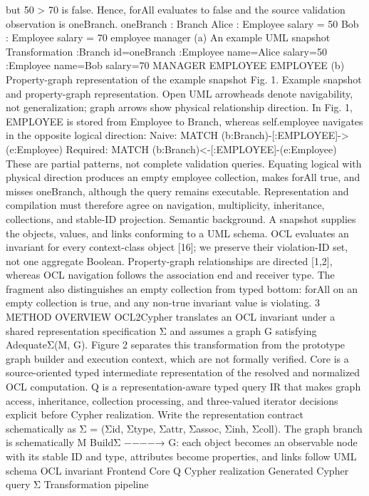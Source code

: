 but 50 > 70 is false. Hence, forAll evaluates to false and the source validation observation is {oneBranch}.
oneBranch : Branch
Alice : Employee
salary = 50
Bob : Employee
salary = 70
employee
manager
(a) An example UML snapshot
Transformation
:Branch
id=oneBranch
:Employee
name=Alice
salary=50
:Employee
name=Bob
salary=70
MANAGER
EMPLOYEE EMPLOYEE
(b) Property-graph representation
of the example snapshot
Fig. 1. Example snapshot and property-graph representation. Open UML arrowheads denote navigability, not generalization; graph arrows show physical relationship direction.
In Fig. 1, EMPLOYEE is stored from Employee to Branch, whereas self.employee
navigates in the opposite logical direction:
Naive: MATCH (b:Branch)-[:EMPLOYEE]->(e:Employee)
Required: MATCH (b:Branch)<-[:EMPLOYEE]-(e:Employee)
These are partial patterns, not complete validation queries. Equating logical with
physical direction produces an empty employee collection, makes forAll true, and
misses oneBranch, although the query remains executable. Representation and compilation must therefore agree on navigation, multiplicity, inheritance, collections, and
stable-ID projection.
Semantic background. A snapshot supplies the objects, values, and links conforming
to a UML schema. OCL evaluates an invariant for every context-class object [16]; we
preserve their violation-ID set, not one aggregate Boolean. Property-graph relationships
are directed [1,2], whereas OCL navigation follows the association end and receiver
type. The fragment also distinguishes an empty collection from typed bottom: forAll
on an empty collection is true, and any non-true invariant value is violating.
3 METHOD OVERVIEW
OCL2Cypher translates an OCL invariant under a shared representation specification Σ
and assumes a graph G satisfying AdequateΣ(M, G). Figure 2 separates this transformation from the prototype graph builder and execution context, which are not formally
verified.
Core is a source-oriented typed intermediate representation of the resolved and normalized OCL computation. Q is a representation-aware typed query IR that makes graph
access, inheritance, collection processing, and three-valued iterator decisions explicit
before Cypher realization.
Write the representation contract schematically as Σ = (Σid, Σtype, Σattr, Σassoc, Σinh,
Σcoll). The graph branch is schematically M
BuildΣ −−−−→ G: each object becomes an observable node with its stable ID and type, attributes become properties, and links follow
UML
schema
OCL
invariant
Frontend Core Q
Cypher
realization
Generated
Cypher query
Σ
Transformation pipeline
